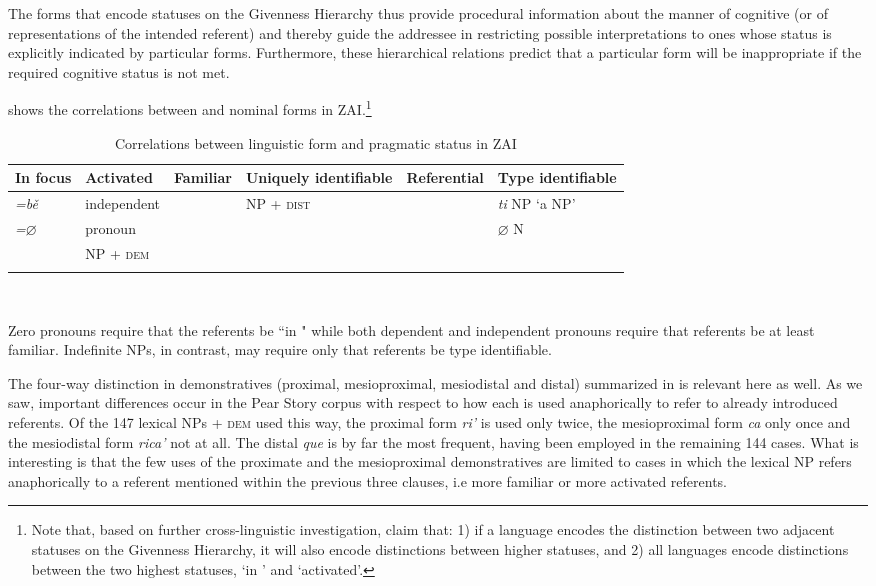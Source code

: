 The forms that encode statuses on the Givenness Hierarchy thus provide procedural information about the manner of cognitive  (or  of representations of the intended referent) and thereby guide the addressee in restricting possible interpretations to ones whose status is explicitly indicated by particular forms. Furthermore, these  hierarchical relations predict that a particular form will be inappropriate if the required cognitive status is not met. 


 shows the correlations between  and nominal forms in ZAI.\footnote{Note that, based on further cross-linguistic investigation, \citet{gundel2010} claim that: 1) if a language encodes the distinction between two adjacent statuses on the Givenness Hierarchy, it will also encode distinctions between higher statuses, and 2) all languages encode distinctions between the two highest statuses, `in ' and `activated'.}


\begin{table}

\begin{tabularx}{\textwidth}{lllQlQ}
\lsptoprule
 {In} {focus}& {Activated} & {Familiar} & {Uniquely} {identifiable} & {Referential} & {Type} {identifiable} \\ 

 
\midrule
 \textit{=b\v{e}}  & independent &  & NP + \textsc{dist} &  & \textit{ti} NP `a NP' \\
  \textit{=$\varnothing$}  &  pronoun &  & & & {$\varnothing$ N}   \\
  & NP + \textsc{dem} & & & &  \\

\lspbottomrule
\end{tabularx}\\
\caption{{Correlations between linguistic form and pragmatic status in ZAI}}
\label{izcorrelations}

\end{table}


Zero pronouns require that the referents be ``in " while both dependent and independent pronouns require that referents be at least familiar. Indefinite NPs, in contrast, may require only that referents be type identifiable. 

The four-way distinction in demonstratives (proximal, mesioproximal, mesiodistal and distal) summarized in  is relevant here as well. As we saw, important differences occur in the Pear Story corpus with respect to how each  is used anaphorically to refer to already introduced referents. Of the 147 lexical NPs + \textsc{dem} used this way, the proximal form \textit{ri'} is used only twice, the mesioproximal form \textit{ca} only once and the mesiodistal form \textit{rica'} not at all. The distal  \textit{que} is by far the most frequent, having been employed in the remaining 144 cases. What is interesting is that the few uses of the proximate and the mesioproximal demonstratives are limited to cases in which the lexical NP refers anaphorically to a referent mentioned within the previous three clauses, i.e more familiar or more activated referents. 


